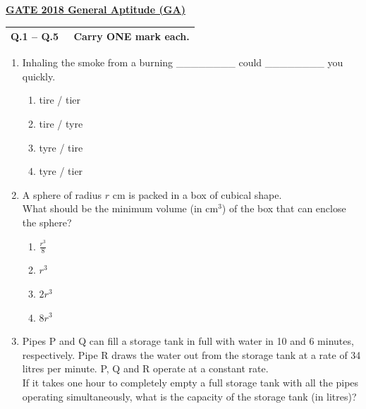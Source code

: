 \documentclass[journal,12pt,onecolumn]{exam}
\theoremstyle{remark}
\begin{document}
\textbf{\underline {GATE 2018 General Aptitude (GA)}}
\vspace{1em}

\begin{tabular}{|p{15cm}|}
\hline
\textbf{Q.1 -- Q.5 \ \ Carry ONE mark each.} \\
\hline
\end{tabular}
\vspace{1em}



\begin{enumerate}
    \item Inhaling the smoke from a burning \_\_\_\_\_\_\_\_ could \_\_\_\_\_\_\_\_ you quickly.
    \begin{enumerate}
        \item tire / tier
        \item tire / tyre
        \item tyre / tire
        \item tyre / tier
    \end{enumerate}



    \item A sphere of radius \( r \) cm is packed in a box of cubical shape.\\
    What should be the minimum volume (in cm\(^3\)) of the box that can enclose the sphere?
    
    \begin{enumerate}
        \item \( \frac{r^3}{8} \)
        \item \( r^3 \)
        \item \( 2r^3 \)
        \item \( 8r^3 \)
    \end{enumerate}

 \item Pipes P and Q can fill a storage tank in full with water in 10 and 6 minutes, respectively. Pipe R draws the water out from the storage tank at a rate of 34 litres per minute. P, Q and R operate at a constant rate.\\

    If it takes one hour to completely empty a full storage tank with all the pipes operating simultaneously, what is the capacity of the storage tank (in litres)?


\end{enumerate}
\end{document}
